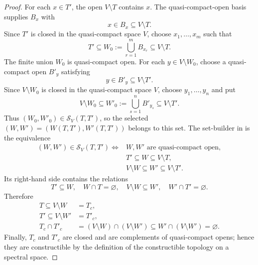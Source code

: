 \begin{proof}
  For each $x\in T'$, the open $V\setminus T$ contains $x$.  The
  quasi-compact-open basis supplies $B_x$ with
  \[
    x\in B_x\subseteq V\setminus T.
  \]
  Since $T'$ is closed in the quasi-compact space $V$, choose
  $x_1,\ldots,x_m$ such that
  \[
    T'\subseteq W_0:=\bigcup_{r=1}^mB_{x_r}\subseteq V\setminus T.
  \]
  The finite union $W_0$ is quasi-compact open.  For each
  $y\in V\setminus W_0$, choose a quasi-compact open
  $B'_y$ satisfying
  \[
    y\in B'_y\subseteq V\setminus T'.
  \]
  Since $V\setminus W_0$ is closed in the quasi-compact space $V$, choose
  $y_1,\ldots,y_n$ and put
  \[
    V\setminus W_0\subseteq
      W'_0:=\bigcup_{s=1}^nB'_{y_s}\subseteq V\setminus T'.
  \]
  Thus $(W_0,W'_0)\in\mathscr S_V(T,T')$, so the selected
  $(W,W')=(W(T,T'),W'(T,T'))$ belongs to this set.  The set-builder in
   is the equivalence
  \[
  \begin{aligned}
    (W,W')\in\mathscr S_V(T,T')
      \Longleftrightarrow{}&
      W,W'\text{ are quasi-compact open},\\
      &T'\subseteq W\subseteq V\setminus T,\\
      &V\setminus W\subseteq W'\subseteq V\setminus T'.
  \end{aligned}
  \]
  Its right-hand side contains the relations
  \[
    T'\subseteq W,\quad W\cap T=\varnothing,\quad
    V\setminus W\subseteq W',\quad W'\cap T'=\varnothing.
  \]
  Therefore
  \[
  \begin{aligned}
    T\subseteq V\setminus W&=T_c,\\
    T'\subseteq V\setminus W'&=T'_c,\\
    T_c\cap T'_c
      &=(V\setminus W)\cap(V\setminus W')
       \subseteq W'\cap(V\setminus W')=\varnothing.
  \end{aligned}
  \]
  Finally, $T_c$ and $T'_c$ are closed and are complements of quasi-compact
  opens; hence they are constructible by the definition of the constructible
  topology on a spectral space.
\end{proof}

